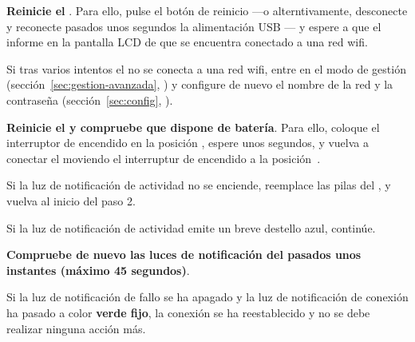 \begin{enumeratecompact}

\item \textbf{Reinicie el \MIE}. Para ello, pulse el botón de reinicio  ---o alterntivamente, desconecte y reconecte pasados unos segundos la alimentación USB --- y espere a que el \MI informe en la pantalla LCD  de que se encuentra conectado a una red wifi.

\begin{itemizecompact}

\item Si tras varios intentos el \MI no se conecta a una red wifi, entre en el modo de gestión (sección~\ref{sec:gestion-avanzada}, ) y configure de nuevo el nombre de la red y la contraseña (sección~\ref{sec:config}, ).

\end{itemizecompact}

\item \textbf{Reinicie el \MEE y compruebe que dispone de batería}. Para ello, coloque el interruptor de encendido  en la posición \off, espere unos segundos, y vuelva a conectar el \ME moviendo el interruptur de encendido  a la posición~\on. 

\begin{itemizecompact}

\item Si la luz de notificación de actividad  no se enciende, reemplace las pilas del \ME, y vuelva al inicio del paso 2.

\item Si la luz de notificación de actividad  emite un breve destello azul, continúe. 

\end{itemizecompact}


\item \textbf{Compruebe de nuevo las luces de notificación del \MIE pasados unos instantes (máximo 45 segundos)}.

\begin{itemizecompact}

\item Si la luz de notificación de fallo  se ha apagado y la luz de notificación de conexión  ha pasado a color \textbf{verde fijo}, la conexión se ha reestablecido y no se debe realizar ninguna acción más.


\end{itemizecompact}
\end{enumeratecompact}
